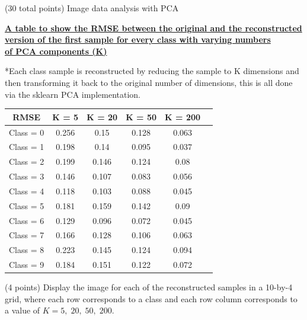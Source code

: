 \documentclass[12pt]{article}
\begin{document}
\begin{question}{(30 total points) Image data analysis with PCA}
\begin{subquestion}
      \begin{answerbox}{25em}
        \begin{center}
        \textbf{\underline{A table to show the RMSE between the original and the reconstructed}}\\
        \textbf{\underline{version of the first sample for every class with varying numbers}}\\
        \textbf{\underline{of PCA components (K)}} \\
        \vspace{0.3cm}
        \footnotesize{*Each class sample is reconstructed by reducing the sample to K dimensions and then transforming it back to the original number of dimensions, this is all done via the sklearn PCA implementation.\\
        \vspace{0.5cm}
        \begin{tabular}{ |c|c|c|c|c|c| } \hline
            \textbf{RMSE} & K = 5 & K = 20 & K = 50 & K = 200 \\ \hline
            Class = 0 & 0.256 & 0.15 & 0.128 & 0.063 \\
            Class = 1 & 0.198 & 0.14 & 0.095 & 0.037 \\
            Class = 2 & 0.199 & 0.146 & 0.124 & 0.08 \\
            Class = 3 & 0.146 & 0.107 & 0.083 & 0.056 \\
            Class = 4 & 0.118 & 0.103 & 0.088 & 0.045 \\
            Class = 5 & 0.181 & 0.159 & 0.142 & 0.09 \\
            Class = 6 & 0.129 & 0.096 & 0.072 & 0.045 \\
            Class = 7 & 0.166 & 0.128 & 0.106 & 0.063 \\
            Class = 8 & 0.223 & 0.145 & 0.124 & 0.094 \\
            Class = 9 & 0.184 & 0.151 & 0.122 & 0.072 \\
            \hline
        \end{tabular}
        }
        \end{center}
      \end{answerbox}
  


   \end{subquestion}
   
   \begin{subquestion}{(4 points)
       Display the image for each of the reconstructed samples in
       a 10-by-4 grid, where each row corresponds to a class and
       each row column corresponds to a value of $K=5, \; 20, \; 50, \; 200$.
     } \label{Q1.7}



\end{subquestion}
\end{question}
\end{document}
